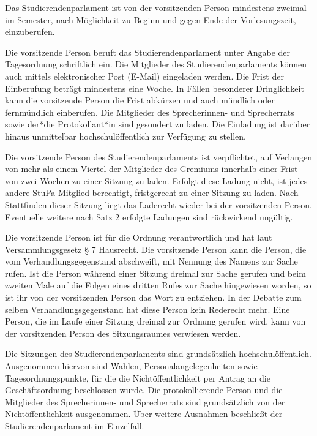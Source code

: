 \documentclass[10pt,a4paper]{scrartcl}
\begin{document}
\begin{contract}


\label{allgemeines-1}

  Das Studierendenparlament ist von der vorsitzenden Person mindestens
  zweimal im Semester, nach Möglichkeit zu Beginn und gegen Ende der
  Vorlesungszeit, einzuberufen.

  Die vorsitzende Person beruft das Studierendenparlament unter Angabe
  der Tagesordnung schriftlich ein. Die Mitglieder des Studierendenparlaments
  können auch mittels elektronischer Post (E-Mail) eingeladen
  werden. Die Frist der Einberufung beträgt mindestens eine Woche. In
  Fällen besonderer Dringlichkeit kann die vorsitzende Person die Frist
  abkürzen und auch mündlich oder fernmündlich einberufen. Die
  Mitglieder des Sprecherinnen- und Sprecherrats sowie der*die
  Protokollant*in sind gesondert zu laden. Die Einladung ist darüber
  hinaus unmittelbar hochschulöffentlich zur Verfügung zu stellen.

  Die vorsitzende Person des Studierendenparlaments ist verpflichtet,
  auf Verlangen von mehr als einem Viertel der Mitglieder des Gremiums
  innerhalb einer Frist von zwei Wochen zu einer Sitzung zu laden.
  Erfolgt diese Ladung nicht, ist jedes andere StuPa-Mitglied
  berechtigt, fristgerecht zu einer Sitzung zu laden. Nach Stattfinden
  dieser Sitzung liegt das Laderecht wieder bei der vorsitzenden Person.
  Eventuelle weitere nach Satz 2 erfolgte Ladungen sind rückwirkend
  ungültig.

  Die vorsitzende Person ist für die Ordnung verantwortlich und hat laut
  Versammlungsgesetz § 7 Hausrecht. Die vorsitzende Person kann die
  Person, die vom Verhandlungsgegenstand abschweift, mit Nennung des
  Namens zur Sache rufen. Ist die Person während einer Sitzung dreimal
  zur Sache gerufen und beim zweiten Male auf die Folgen eines dritten
  Rufes zur Sache hingewiesen worden, so ist ihr von der vorsitzenden
  Person das Wort zu entziehen. In der Debatte zum selben
  Verhandlungsgegenstand hat diese Person kein Rederecht mehr. Eine
  Person, die im Laufe einer Sitzung dreimal zur Ordnung gerufen wird,
  kann von der vorsitzenden Person des Sitzungsraumes verwiesen werden.

  Die Sitzungen des Studierendenparlaments sind grundsätzlich
  hochschulöffentlich. Ausgenommen hiervon sind Wahlen,
  Personalangelegenheiten sowie Tagesordnungspunkte, für die die
  Nichtöffentlichkeit per Antrag an die Geschäftsordnung beschlossen
  wurde. Die protokollierende Person und die Mitglieder des
  Sprecherinnen- und Sprecherrats sind grundsätzlich von der
  Nichtöffentlichkeit ausgenommen. Über weitere Ausnahmen beschließt der
  Studierendenparlament im Einzelfall.


\end{contract}
\end{document}
